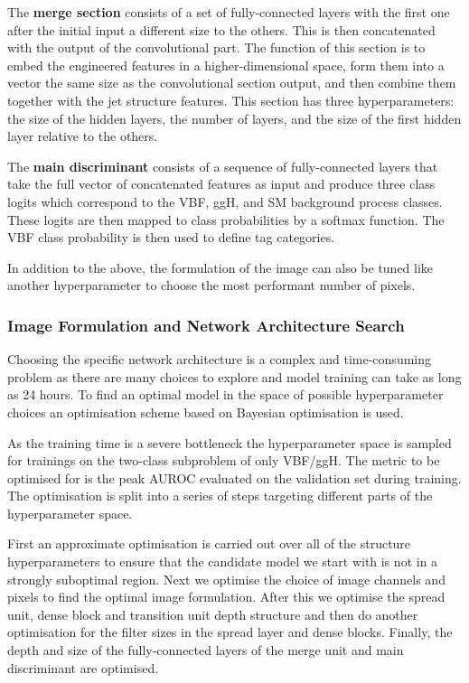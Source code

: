 The \textbf{merge section} consists of a set of fully-connected layers with the first one after the initial input a different size to the others. This is then concatenated with the output of the convolutional part.
The function of this section is to embed the engineered features in a higher-dimensional space, form them into a vector the same size as the convolutional section output, and then combine them together with the jet structure features. This section has three hyperparameters: the size of the hidden layers, the number of layers, and the size of the first hidden layer relative to the others. 


The \textbf{main discriminant} consists of a sequence of fully-connected layers that take the full vector of concatenated features as input and produce three class logits which correspond to the VBF, ggH, and SM background process classes. 
These logits are then mapped to class probabilities by a softmax function. The VBF class probability is then used to define tag categories. 

In addition to the above, the formulation of the image can also be tuned like another hyperparameter to choose the most performant number of pixels. 



\subsubsection{Image Formulation and Network Architecture Search}
Choosing the specific network architecture is a complex and time-consuming problem as there are many choices to explore and model training can take as long as 24 hours.
To find an optimal model in the space of possible hyperparameter choices an optimisation scheme based on Bayesian optimisation is used. 


As the training time is a severe bottleneck the hyperparameter space is sampled for trainings on the two-class subproblem of only VBF/ggH. 
The metric to be optimised for is the peak AUROC evaluated on the validation set during training.  
The optimisation is split into a series of steps targeting different parts of the hyperparameter space.

First an approximate optimisation is carried out over all of the structure hyperparameters to ensure that the candidate model we start with is not in a strongly suboptimal region. 
Next we optimise the choice of image channels and pixels to find the optimal image formulation. After this we optimise the spread unit, dense block and transition unit depth structure and then do another optimisation for the filter sizes in the spread layer and dense blocks. Finally, the depth and size of the fully-connected layers of the merge unit and main discriminant are optimised. 

